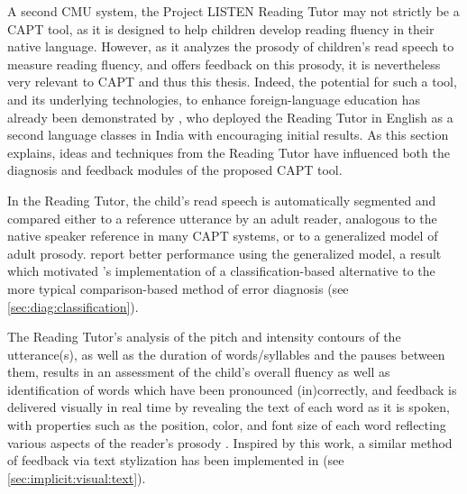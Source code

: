 	A second CMU system, the Project LISTEN Reading Tutor \citep{Mostow2012} 
may not strictly be a CAPT tool, as it 
is designed to help children develop reading fluency in their native language. 
However, as 
it analyzes the prosody of children's read speech to measure reading fluency, and offers feedback on this prosody, 
it is nevertheless very relevant to CAPT and thus this thesis. 
	Indeed, the potential for such a tool, and its underlying technologies, to enhance foreign-language education has already been demonstrated by 
	\textcite{Weber2010}, who deployed the Reading Tutor in English as a second language classes in India with encouraging initial results. 
	As this section explains, ideas and techniques from the Reading Tutor have influenced both the diagnosis and feedback modules of the proposed CAPT tool. 
	
	
	In the Reading Tutor, the child's read speech is automatically segmented and compared either to a reference utterance by an adult reader, analogous to the native speaker reference in many CAPT systems, or to a generalized model of adult prosody. \textcite{Duong2011} report better performance using the generalized model, a result which motivated 's implementation of a classification-based alternative to the more typical comparison-based method of error diagnosis (see \cref{sec:diag:classification}).
	
	 The Reading Tutor's analysis of the pitch and intensity contours of the utterance(s), as well as the duration of words/syllables and the pauses between them, results in an assessment of the child's overall fluency as well as identification of words which have been pronounced (in)correctly, and feedback is delivered visually in real time by revealing the text of each word as it is spoken, with properties such as the position, color, and font size of each word reflecting various aspects of the reader's prosody \citep{Sitaram2011}. Inspired by this work, a similar method of feedback via text stylization has been implemented in  (see \cref{sec:implicit:visual:text}). 
	
